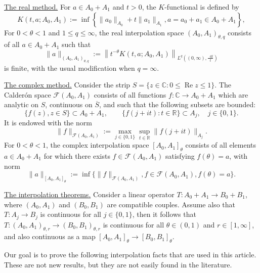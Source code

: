 \documentclass[11pt,a4paper,reqno]{amsart}
\theoremstyle{plain}
\theoremstyle{remark}
\newcommand{\dd}{\mathop{}\!\mathrm{d}}
\begin{document}
\noindent \underline{The real method.} 
For $a\in A_0+A_1$ and $t>0$, the $K$-functional is defined by
\[
    K(t,a;A_0,A_1) := \inf\left\{ \|a_0\|_{A_0}+t\|a_1\|_{A_1}, a=a_0+a_1 \in A_0 + A_1 \right\},
\]
For $0<\theta<1$ and $1\leq q\leq\infty$, the real interpolation space
$(A_0,A_1)_{\theta,q}$ consists of all $a\in A_0+A_1$ such that
\[
    \|a\|_{(A_0,A_1)_{\theta,q}} := \left\| t^{-\theta}K(t,a;A_0,A_1)\right\|_{L^q((0,\infty),\frac{\dd t}{t})}
\]
is finite, with the usual modification when $q=\infty$.
\medskip 

\noindent \underline{The complex method.}
Consider the strip $S=\{z\in\mathbb{C} : 0\leq\operatorname{Re}z\leq1\}$.
The Calder\'on space $\mathcal{F}(A_0,A_1)$ consists of all functions
$f : \mathbb{C} \to A_0+A_1$ which are analytic on $S$, continuous on $\overline{S}$, and such that the following subsets are bounded: 
\[
    \{f(z), z \in S\} \subset A_0 + A_1, \qquad \{f(j+it) : t \in \mathbb{R}\} \subset A_j, \quad j\in\{0,1\}.
\]
It is endowed with the norm
\[
    \|f\|_{\mathcal{F}(A_0,A_1)}  := \max_{j \in \{0,1\}}\sup_{t\in\mathbb{R}}\|f(j+it)\|_{A_j}.
\]
For $0<\theta<1$, the complex interpolation space $[A_0,A_1]_\theta$ consists of all elements $a\in A_0+A_1$ for which there exists
$f\in\mathcal{F}(A_0,A_1)$ satisfying $f(\theta)=a$, with norm
\[
    \|a\|_{[A_0,A_1]_\theta} := \inf\{\|f\|_{\mathcal{F}(A_0,A_1)}, f\in\mathcal{F}(A_0,A_1), f(\theta)=a\}.
\]

\medskip

\noindent
\underline{The interpolation theorems.} Consider a linear operator $T : A_0 + A_1 \to B_0 + B_1$, where $(A_0,A_1)$ and $(B_0,B_1)$ are compatible couples. Assume also that $T : A_j \to B_j$ is continuous for all $j \in \{0,1\}$, then it follows \cite[Theorem 3.1.2, Theorem 4.1.2]{BerghLofstrom} that $T : (A_0,A_1)_{\theta,r} \to (B_0,B_1)_{\theta,r}$ is continuous for all $\theta \in (0,1)$ and $r \in [1, \infty]$, and also continuous as a map $[A_0,A_1]_{\theta} \to [B_0,B_1]_{\theta}$.

Our goal is to prove the following interpolation facts that are used in this article. 
These are not new results, but they are not easily found in the literature.
\end{document}
